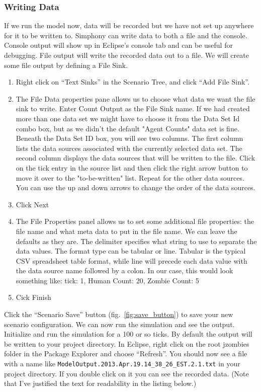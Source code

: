 \documentclass[11pt]{amsart}
\begin{document}
\subsubsection{Writing Data}

If we run the model now, data will be recorded but we have not set up anywhere for it to be written to.  Simphony can write data to both a file and the console. Console output will show up in Eclipse's console tab and can be useful for debugging. File output will write the recorded data out to a file. We will create some file output by defining a File Sink. 

\vspace{.2in}
\begin{enumerate}
\item Right click on ``Text Sinks'' in the Scenario Tree, and click ``Add File Sink''. 
\item The File Data properties pane allows us to choose what data we want the file sink to write. Enter Count Output as the File Sink name. If we had created more than one data set we might have to choose it from the Data Set Id combo box, but as we didn't the default "Agent Counts" data set is fine. Beneath the Data Set ID box, you will see two columns. The first column lists the data sources associated with the currently selected data set. The second column displays the data sources that will be written to the file. Click on the tick entry in the source list and then click the right arrow button to move it over to the "to-be-written" list. Repeat for the other data sources. You can use the up and down arrows to change the order of the data sources.
\item Click Next
\item The File Properties panel allows us to set some additional file properties: the file name and what meta data to put in the file name. We can leave the defaults as they are. The delimiter specifies what string to use to separate the data values. The format type can be tabular or line. Tabular is the typical CSV spreadsheet table format, while line will precede each data value with the data source name followed by a colon. In our case, this would look something like: tick: 1, Human Count: 20, Zombie Count: 5
\item Cick Finish
\end{enumerate}
\vspace{.2in}

Click the ``Scenario Save''  button (fig.~\ref{fig:save_button}) to save your new scenario configuration. We can now run the simulation and see the output. Initialize and run the simulation for a 100 or so ticks. By default the output will be written to your project directory. In Eclipse, right click on the root jzombies folder in the Package Explorer and choose ``Refresh''. You should now see a file with a name like \texttt{ModelOutput.2013.Apr.19.14\_38\_26\_EST.2.1.txt} in your project directory. If you double click on it you can see the recorded data. (Note that I've justified the text for readability in the listing below.)
\end{document}
